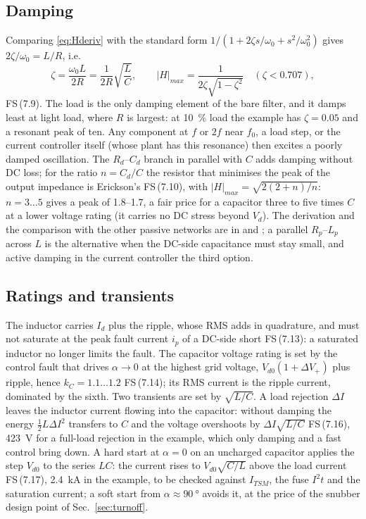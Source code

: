 \documentclass[10pt,a4paper]{scrartcl}
\newcommand{\Vdo}{V_{d0}}
\newcommand{\Vd}{V_{d}}
\newcommand{\Id}{I_{d}}
\newcommand{\ITSM}{I_{TSM}}
\newcommand{\iit}{I^{2}t}
\newcommand{\fs}[1]{\textsf{FS}\,(#1)}
\begin{document}
\subsection{Damping}
Comparing \eqref{eq:Hderiv} with the standard form $1/(1 + 2\zeta s/\omega_0 + s^2/\omega_0^2)$ gives $2\zeta/\omega_0 = L/R$, i.e.
\begin{equation}
\zeta = \frac{\omega_0L}{2R} = \frac{1}{2R}\sqrt{\frac{L}{C}}, \qquad |H|_{max} = \frac{1}{2\zeta\sqrt{1-\zeta^2}} \quad (\zeta<0.707) ,
\label{eq:zetaderiv}
\end{equation}
\fs{7.9}. The load is the only damping element of the bare filter, and it damps least at light load, where $R$ is largest: at \SI{10}{\percent} load the example has $\zeta = 0.05$ and a resonant peak of ten. Any component at $f$ or $2f$ near $f_0$, a load step, or the current controller itself (whose plant has this resonance) then excites a poorly damped oscillation. The $R_d$--$C_d$ branch in parallel with $C$ adds damping without DC loss; for the ratio $n = C_d/C$ the resistor that minimises the peak of the output impedance is Erickson's \fs{7.10}, with $|H|_{max} = \sqrt{2(2+n)/n}$: $n = 3\ldots5$ gives a peak of 1.8--1.7, a fair price for a capacitor three to five times $C$ at a lower voltage rating (it carries no DC stress beyond $\Vd$). The derivation and the comparison with the other passive networks are in \cite{bagnara_filter} and \cite{erickson}; a parallel $R_p$--$L_p$ across $L$ is the alternative when the DC-side capacitance must stay small, and active damping in the current controller the third option.

\subsection{Ratings and transients}
The inductor carries $\Id$ plus the ripple, whose RMS adds in quadrature, and must not saturate at the peak fault current $i_p$ of a DC-side short \fs{7.13}: a saturated inductor no longer limits the fault. The capacitor voltage rating is set by the control fault that drives $\alpha\to0$ at the highest grid voltage, $\Vdo(1+\Delta V_+)$ plus ripple, hence $k_C = 1.1\ldots1.2$ \fs{7.14}; its RMS current is the ripple current, dominated by the sixth. Two transients are set by $\sqrt{L/C}$. A load rejection $\Delta I$ leaves the inductor current flowing into the capacitor: without damping the energy $\tfrac12L\Delta I^2$ transfers to $C$ and the voltage overshoots by $\Delta I\sqrt{L/C}$ \fs{7.16}, \SI{423}{V} for a full-load rejection in the example, which only damping and a fast control bring down. A hard start at $\alpha = 0$ on an uncharged capacitor applies the step $\Vdo$ to the series $LC$: the current rises to $\Vdo\sqrt{C/L}$ above the load current \fs{7.17}, \SI{2.4}{kA} in the example, to be checked against $\ITSM$, the fuse $\iit$ and the saturation current; a soft start from $\alpha\approx\SI{90}{\degree}$ avoids it, at the price of the snubber design point of Sec.~\ref{sec:turnoff}.
\end{document}
